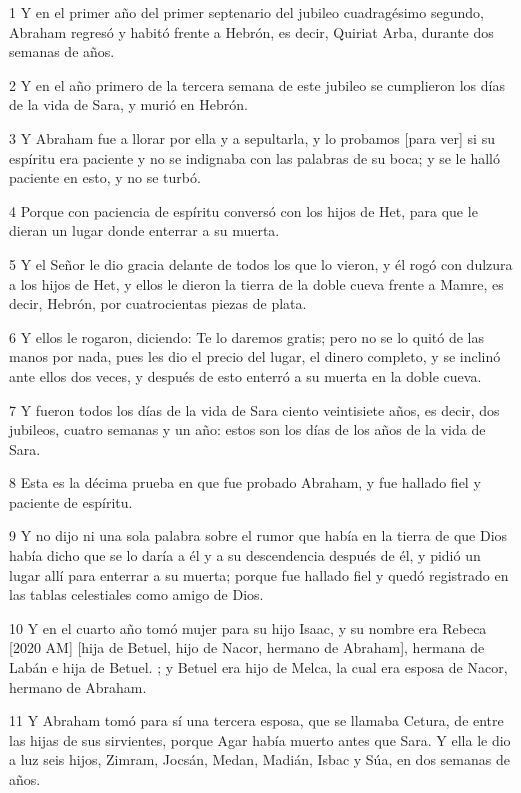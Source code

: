 \par 1 Y en el primer año del primer septenario del jubileo cuadragésimo segundo, Abraham regresó y habitó frente a Hebrón, es decir, Quiriat Arba, durante dos semanas de años.
\par 2 Y en el año primero de la tercera semana de este jubileo se cumplieron los días de la vida de Sara, y murió en Hebrón.
\par 3 Y Abraham fue a llorar por ella y a sepultarla, y lo probamos [para ver] si su espíritu era paciente y no se indignaba con las palabras de su boca; y se le halló paciente en esto, y no se turbó.
\par 4 Porque con paciencia de espíritu conversó con los hijos de Het, para que le dieran un lugar donde enterrar a su muerta.
\par 5 Y el Señor le dio gracia delante de todos los que lo vieron, y él rogó con dulzura a los hijos de Het, y ellos le dieron la tierra de la doble cueva frente a Mamre, es decir, Hebrón, por cuatrocientas piezas de plata.
\par 6 Y ellos le rogaron, diciendo: Te lo daremos gratis; pero no se lo quitó de las manos por nada, pues les dio el precio del lugar, el dinero completo, y se inclinó ante ellos dos veces, y después de esto enterró a su muerta en la doble cueva.
\par 7 Y fueron todos los días de la vida de Sara ciento veintisiete años, es decir, dos jubileos, cuatro semanas y un año: estos son los días de los años de la vida de Sara.
\par 8 Esta es la décima prueba en que fue probado Abraham, y fue hallado fiel y paciente de espíritu.
\par 9 Y no dijo ni una sola palabra sobre el rumor que había en la tierra de que Dios había dicho que se lo daría a él y a su descendencia después de él, y pidió un lugar allí para enterrar a su muerta; porque fue hallado fiel y quedó registrado en las tablas celestiales como amigo de Dios.
\par 10 Y en el cuarto año tomó mujer para su hijo Isaac, y su nombre era Rebeca [2020 AM] [hija de Betuel, hijo de Nacor, hermano de Abraham], hermana de Labán e hija de Betuel. ; y Betuel era hijo de Melca, la cual era esposa de Nacor, hermano de Abraham.
\par 11 Y Abraham tomó para sí una tercera esposa, que se llamaba Cetura, de entre las hijas de sus sirvientes, porque Agar había muerto antes que Sara. Y ella le dio a luz seis hijos, Zimram, Jocsán, Medan, Madián, Isbac y Súa, en dos semanas de años.
